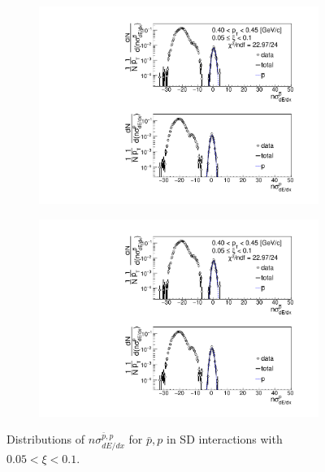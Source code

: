 \begin{figure}[h!]
\begin{subfigure}{.32\textwidth}
		\includegraphics[width=\linewidth, page=11]{chapters/chrgSTAR/img/dEdx/fit2019_thirdStep_2_1.pdf}
	\end{subfigure}
	\begin{subfigure}{.32\textwidth}
		\includegraphics[width=\linewidth, page=12]{chapters/chrgSTAR/img/dEdx/fit2019_thirdStep_2_1.pdf}
	\end{subfigure}
	\caption[Distributions of $n\sigma^{\bar{p},p}_{dE/dx}$ for $\bar{p},p$ in SD interactions with $0.05 < \xi<0.1$]{Distributions of $n\sigma^{\bar{p},p}_{dE/dx}$ for $\bar{p},p$ in SD interactions with $0.05 < \xi<0.1$.}
	\label{fig:nsigmapfit_1}
\end{figure}
